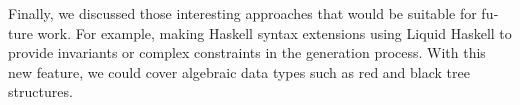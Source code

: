 \begin{otherlanguage}{english}
	Finally, we discussed those interesting approaches that would be suitable for future work. For example, making Haskell syntax extensions using Liquid Haskell to provide invariants or complex constraints in the generation process. With this new feature, we could cover algebraic data types such as red and black tree structures.
		
\end{otherlanguage}


